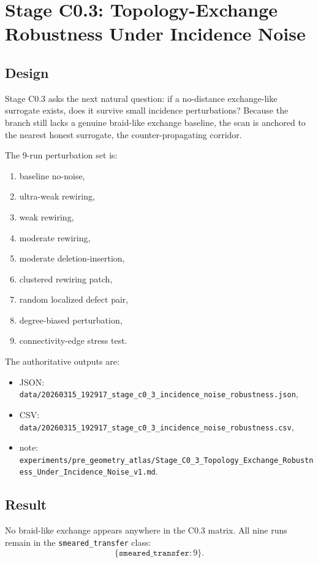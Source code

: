 \documentclass[11pt]{article}
\begin{document}
\section{Stage C0.3: Topology-Exchange Robustness Under Incidence Noise}

\subsection{Design}

Stage C0.3 asks the next natural question: if a no-distance exchange-like surrogate exists, does it survive small incidence perturbations? Because the branch still lacks a genuine braid-like exchange baseline, the scan is anchored to the nearest honest surrogate, the counter-propagating corridor.

The 9-run perturbation set is:
\begin{enumerate}
\item baseline no-noise,
\item ultra-weak rewiring,
\item weak rewiring,
\item moderate rewiring,
\item moderate deletion-insertion,
\item clustered rewiring patch,
\item random localized defect pair,
\item degree-biased perturbation,
\item connectivity-edge stress test.
\end{enumerate}

The authoritative outputs are:
\begin{itemize}
\item JSON: \texttt{data/20260315\_192917\_stage\_c0\_3\_incidence\_noise\_robustness.json},
\item CSV: \texttt{data/20260315\_192917\_stage\_c0\_3\_incidence\_noise\_robustness.csv},
\item note: \texttt{experiments/pre\_geometry\_atlas/Stage\_C0\_3\_Topology\_Exchange\_Robustness\_Under\_Incidence\_Noise\_v1.md}.
\end{itemize}

\subsection{Result}

No braid-like exchange appears anywhere in the C0.3 matrix. All nine runs remain in the \texttt{smeared\_transfer} class:
\begin{equation}
\{\texttt{smeared\_transfer}:9\}.
\end{equation}
\end{document}
